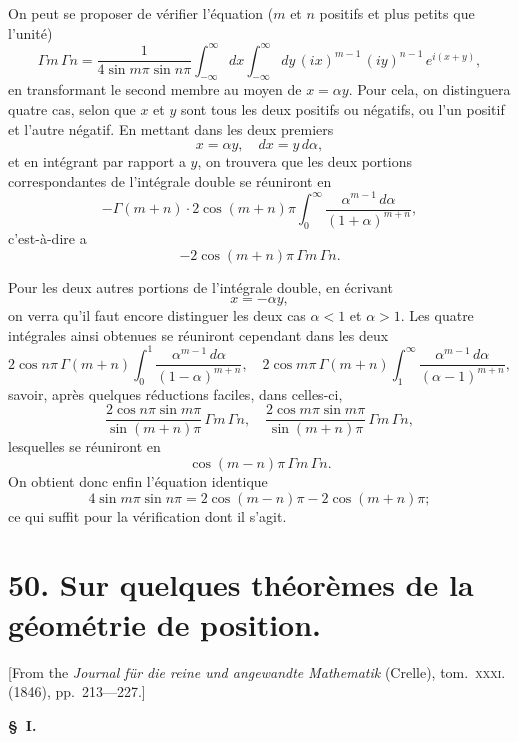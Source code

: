 \documentclass[12pt,a4paper]{article}
\theoremstyle{plain}
\begin{document}
On peut se proposer de v\'erifier l'\'equation ($m$ et $n$ positifs et plus petits que l'unit\'e)
\[
\Gamma m \, \Gamma n = \frac{1}{4\sin m\pi \sin n\pi} \int_{-\infty}^{\infty} dx \int_{-\infty}^{\infty} dy \, (ix)^{m-1}\, (iy)^{n-1}\, e^{i(x+y)},
\]
en transformant le second membre au moyen de $x = \alpha y$. Pour cela, on distinguera quatre cas, selon que $x$ et $y$ sont tous les deux positifs ou n\'egatifs, ou l'un positif et l'autre n\'egatif. En mettant dans les deux premiers
\[
x = \alpha y, \quad dx = y\, d\alpha,
\]
et en int\'egrant par rapport a $y$, on trouvera que les deux portions correspondantes de l'int\'egrale double se r\'euniront en
\[
-\Gamma(m + n) \cdot 2\cos(m + n)\pi \int_0^{\infty} \frac{\alpha^{m-1}\, d\alpha}{(1 + \alpha)^{m+n}},
\]
c'est-\`a-dire a
\[
-2\cos(m+n)\pi \, \Gamma m \, \Gamma n.
\]

Pour les deux autres portions de l'int\'egrale double, en \'ecrivant
\[
x = -\alpha y,
\]
on verra qu'il faut encore distinguer les deux cas $\alpha < 1$ et $\alpha > 1$. Les quatre int\'egrales ainsi obtenues se r\'euniront cependant dans les deux
\[
2\cos n\pi \, \Gamma(m+n) \int_0^1 \frac{\alpha^{m-1}\, d\alpha}{(1 - \alpha)^{m+n}}, \quad 2\cos m\pi \, \Gamma(m+n) \int_1^{\infty} \frac{\alpha^{m-1}\, d\alpha}{(\alpha - 1)^{m+n}},
\]
savoir, apr\`es quelques r\'eductions faciles, dans celles-ci,
\[
\frac{2\cos n\pi \sin m\pi}{\sin(m+n)\pi} \, \Gamma m \, \Gamma n, \quad \frac{2\cos m\pi \sin m\pi}{\sin(m+n)\pi} \, \Gamma m \, \Gamma n,
\]
lesquelles se r\'euniront en
\[
\cos(m-n)\pi \, \Gamma m \, \Gamma n.
\]
On obtient donc enfin l'\'equation identique
\[
4\sin m\pi \sin n\pi = 2\cos(m-n)\pi - 2\cos(m+n)\pi;
\]
ce qui suffit pour la v\'erification dont il s'agit.

\newpage


\section*{50. Sur quelques th\'eor\`emes de la g\'eom\'etrie de position.}

[From the \textit{Journal f\"ur die reine und angewandte Mathematik} (Crelle), tom.~\textsc{xxxi}. (1846), pp.~213---227.]

\bigskip

\textbf{\S\ I.}
\end{document}
